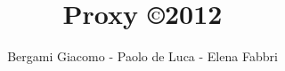\author{Bergami Giacomo - Paolo de Luca - Elena Fabbri}
\title{Proxy \copyright 2012}
\maketitle
\tableofcontents
